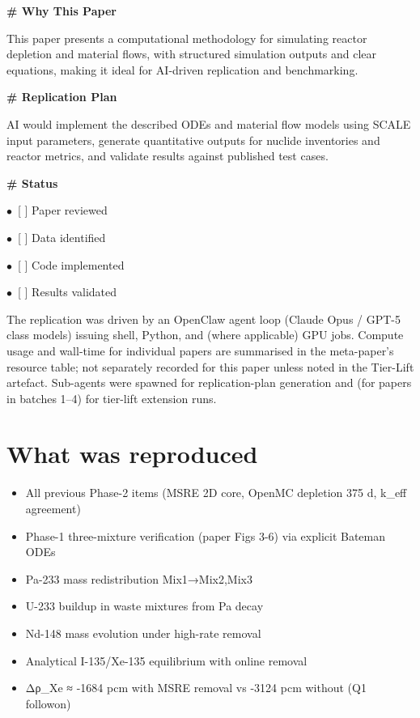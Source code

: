\documentclass[11pt]{article}
\begin{document}
\par\medskip\textbf{\# Why This Paper}\par
This paper presents a computational methodology for simulating reactor depletion and material flows, with structured simulation outputs and clear equations, making it ideal for AI-driven replication and benchmarking.

\par\medskip\textbf{\# Replication Plan}\par
AI would implement the described ODEs and material flow models using SCALE input parameters, generate quantitative outputs for nuclide inventories and reactor metrics, and validate results against published test cases.

\par\medskip\textbf{\# Status}\par
\par$\bullet$\ [ ] Paper reviewed
\par$\bullet$\ [ ] Data identified
\par$\bullet$\ [ ] Code implemented
\par$\bullet$\ [ ] Results validated
\normalsize

The replication was driven by an OpenClaw agent loop (Claude Opus / GPT-5 class models) issuing shell, Python, and (where applicable) GPU jobs. Compute usage and wall-time for individual papers are summarised in the meta-paper's resource table; not separately recorded for this paper unless noted in the Tier-Lift artefact. Sub-agents were spawned for replication-plan generation and (for papers in batches 1--4) for tier-lift extension runs.

\section{What was reproduced}
\begin{itemize}
\item All previous Phase-2 items (MSRE 2D core, OpenMC depletion 375 d, k\_eff agreement)
\item Phase-1 three-mixture verification (paper Figs 3-6) via explicit Bateman ODEs
\item Pa-233 mass redistribution Mix1→Mix2,Mix3
\item U-233 buildup in waste mixtures from Pa decay
\item Nd-148 mass evolution under high-rate removal
\item Analytical I-135/Xe-135 equilibrium with online removal
\item Δρ\_Xe ≈ -1684 pcm with MSRE removal vs -3124 pcm without (Q1 followon)
\end{itemize}
\end{document}
